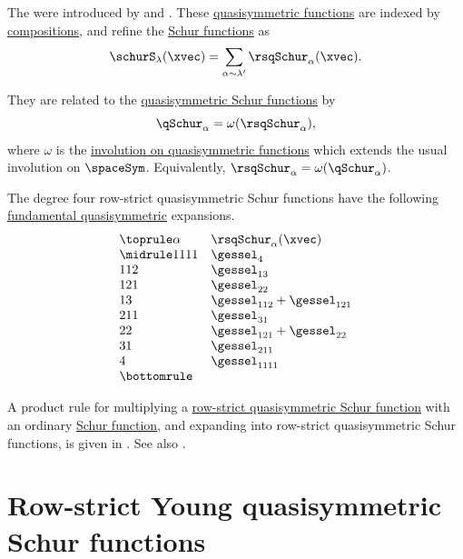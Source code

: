 The 
\label{rowStrictQuasisymmetricSchurFunction} were introduced by
 and  \cite{MasonRemmel2013}.
These \hyperref[quasiSymmetricFunctions]{quasisymmetric functions} are indexed by
\hyperref[weakCompositions]{compositions}, and refine the
\hyperref[schurS]{Schur functions} as
\[
  \schurS_\lambda(\xvec)
  = \sum_{\alpha \sim \lambda'} \rsqSchur_\alpha(\xvec).
\]

They are related to the \hyperref[qSchur]{quasisymmetric Schur functions} by
\[
  \qSchur_\alpha = \omega(\rsqSchur_\alpha),
\]
where $\omega$ is the \hyperref[standardQuasiInvolution]{involution on
quasisymmetric functions} which extends the usual involution on $\spaceSym$.
Equivalently, $\rsqSchur_\alpha=\omega(\qSchur_\alpha)$.

The degree four row-strict quasisymmetric Schur functions have the following
\hyperref[gessel]{fundamental quasisymmetric} expansions.
\[
\begin{array}{ll}
\toprule
\alpha & \rsqSchur_\alpha(\xvec) \\
\midrule
1111 & \gessel_{4} \\
112  & \gessel_{13} \\
121  & \gessel_{22} \\
13   & \gessel_{112}+\gessel_{121} \\
211  & \gessel_{31} \\
22   & \gessel_{121}+\gessel_{22} \\
31   & \gessel_{211} \\
4    & \gessel_{1111} \\
\bottomrule
\end{array}
\]


A product rule for multiplying a
\hyperref[rsqSchur]{row-strict quasisymmetric Schur function} with an ordinary
\hyperref[schurS]{Schur function}, and expanding into row-strict
quasisymmetric Schur functions, is given in \cite[Thm.~13]{Ferreira2011b}.
See also \cite[Thms.~10 and 11]{MasonNiese2015}.





\section[rsyqSchur]{Row-strict Young quasisymmetric Schur functions}


